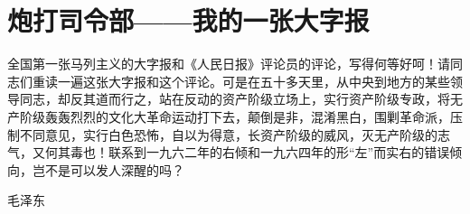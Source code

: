 \section[炮打司令部——我的一张大字报（一九六六年八月五日）]{炮打司令部——我的一张大字报}


全国第一张马列主义的大字报和《人民日报》评论员的评论，写得何等好呵！请同志们重读一遍这张大字报和这个评论。可是在五十多天里，从中央到地方的某些领导同志，却反其道而行之，站在反动的资产阶级立场上，实行资产阶级专政，将无产阶级轰轰烈烈的文化大革命运动打下去，颠倒是非，混淆黑白，围剿革命派，压制不同意见，实行白色恐怖，自以为得意，长资产阶级的威风，灭无产阶级的志气，又何其毒也！联系到一九六二年的右倾和一九六四年的形“左”而实右的错误倾向，岂不是可以发人深醒的吗？
{\raggedleft 毛泽东\par}


